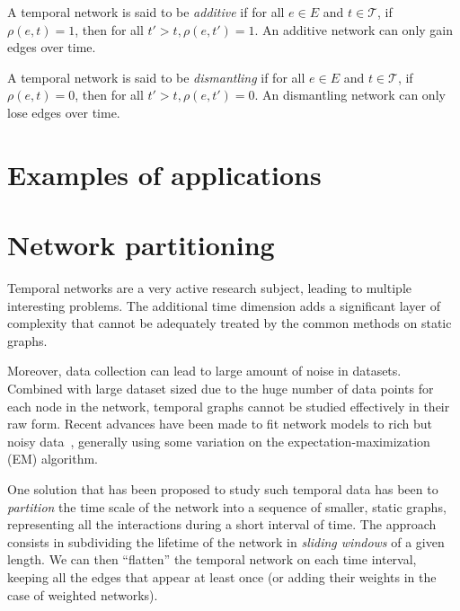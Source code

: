 \documentclass[a4paper,11pt,openany,extrafontsizes]{memoir}
\begin{document}
\begin{defn}\label{defn:additive}
  A temporal network is said to be \emph{additive} if for all $e\in E$
  and $t\in\mathcal{T}$, if $\rho(e,t)=1$, then for all
  $t'>t, \rho(e, t') = 1$. An additive network can only gain edges
  over time.

  A temporal network is said to be \emph{dismantling} if for all
  $e\in E$ and $t\in\mathcal{T}$, if $\rho(e,t)=0$, then for all
  $t'>t, \rho(e, t') = 0$. An dismantling network can only lose edges
  over time.
\end{defn}

\section{Examples of applications}%
\label{sec:exampl-appl}


\section{Network partitioning}%
\label{sec:network-partitioning}


Temporal networks are a very active research subject, leading to
multiple interesting problems. The additional time dimension adds a
significant layer of complexity that cannot be adequately treated by
the common methods on static graphs.

Moreover, data collection can lead to large amount of noise in
datasets. Combined with large dataset sized due to the huge number of
data points for each node in the network, temporal graphs cannot be
studied effectively in their raw form. Recent advances have been made
to fit network models to rich but noisy
data~\cite{newman_network_2018}, generally using some variation on the
expectation-maximization (EM) algorithm.

One solution that has been proposed to study such temporal data has
been to \emph{partition} the time scale of the network into a sequence
of smaller, static graphs, representing all the interactions during a
short interval of time. The approach consists in subdividing the
lifetime of the network in \emph{sliding windows} of a given length.
We can then ``flatten'' the temporal network on each time interval,
keeping all the edges that appear at least once (or adding their
weights in the case of weighted networks).
\end{document}
